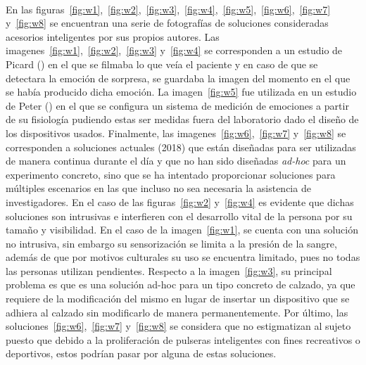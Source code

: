 \paragraph{}
En las figuras~\ref{fig:w1},~\ref{fig:w2},~\ref{fig:w3},~\ref{fig:w4},~\ref{fig:w5},~\ref{fig:w6},~\ref{fig:w7} y~\ref{fig:w8} se encuentran una serie de fotografías de soluciones consideradas acesorios inteligentes por sus propios autores. Las imagenes~\ref{fig:w1},~\ref{fig:w2},~\ref{fig:w3} y~\ref{fig:w4} se corresponden a un estudio de Picard (\citeyear{picard1997affective}) en el que se filmaba lo que veía el paciente y en caso de que se detectara la emoción de sorpresa, se guardaba la imagen del momento en el que se había producido dicha emoción. La imagen~\ref{fig:w5} fue utilizada en un estudio de Peter (\citeyear{peter2005wearable}) en el que se configura un sistema de medición de emociones a partir de su fisiología pudiendo estas ser medidas fuera del laboratorio dado el diseño de los dispositivos usados. Finalmente, las imagenes~\ref{fig:w6},~\ref{fig:w7} y~\ref{fig:w8} se corresponden a soluciones actuales (2018) que están diseñadas para ser utilizadas de manera continua durante el día y que no han sido diseñadas \textit{ad-hoc} para un experimento concreto, sino que se ha intentado proporcionar soluciones para múltiples escenarios en las que incluso no sea necesaria la asistencia de investigadores. En el caso de las figuras~\ref{fig:w2} y~\ref{fig:w4} es evidente que dichas soluciones son intrusivas e interfieren con el desarrollo vital de la persona por su tamaño y visibilidad. En el caso de la imagen~\ref{fig:w1}, se cuenta con una solución no intrusiva, sin embargo su sensorización se limita a la presión de la sangre, además de que por motivos culturales su uso se encuentra limitado, pues no todas las personas utilizan pendientes. Respecto a la imagen~\ref{fig:w3}, su principal problema es que es una solución ad-hoc para un tipo concreto de calzado, ya que requiere de la modificación del mismo en lugar de insertar un dispositivo que se adhiera al calzado sin modificarlo de manera permanentemente. Por último, las soluciones~\ref{fig:w6},~\ref{fig:w7} y~\ref{fig:w8} se considera que no estigmatizan al sujeto puesto que debido a la proliferación de pulseras inteligentes con fines recreativos o deportivos, estos podrían pasar por alguna de estas soluciones.


